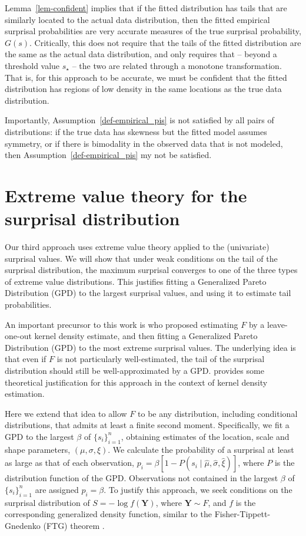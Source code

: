 \documentclass[
  12pt]{article}
\theoremstyle{definition}
\theoremstyle{plain}
\theoremstyle{plain}
\theoremstyle{plain}
\theoremstyle{remark}
\begin{document}
Lemma~\ref{lem-confident} implies that if the fitted distribution has
tails that are similarly located to the actual data distribution, then
the fitted empirical surprisal probabilities are very accurate measures
of the true surprisal probability, \(G(s)\). Critically, this does not
require that the tails of the fitted distribution are the same as the
actual data distribution, and only requires that -- beyond a threshold
value \(s_\star\) -- the two are related through a monotone
transformation. That is, for this approach to be accurate, we must be
confident that the fitted distribution has regions of low density in the
same locations as the true data distribution.

Importantly, Assumption~\ref{def-empirical_pis} is not satisfied by all
pairs of distributions: if the true data has skewness but the fitted
model assumes symmetry, or if there is bimodality in the observed data
that is not modeled, then Assumption~\ref{def-empirical_pis} my not be
satisfied.

\section{Extreme value theory for the surprisal
distribution}\label{sec-gpd}

Our third approach uses extreme value theory applied to the (univariate)
surprisal values. We will show that under weak conditions on the tail of
the surprisal distribution, the maximum surprisal converges to one of
the three types of extreme value distributions. This justifies fitting a
Generalized Pareto Distribution (GPD) to the largest surprisal values,
and using it to estimate tail probabilities.

An important precursor to this work is \citet{lookout} who proposed
estimating \(F\) by a leave-one-out kernel density estimate, and then
fitting a Generalized Pareto Distribution (GPD) to the most extreme
surprisal values. The underlying idea is that even if \(F\) is not
particularly well-estimated, the tail of the surprisal distribution
should still be well-approximated by a GPD. \citet{lookout2} provides
some theoretical justification for this approach in the context of
kernel density estimation.

Here we extend that idea to allow \(F\) to be any distribution,
including conditional distributions, that admits at least a finite
second moment. Specifically, we fit a GPD to the largest \(\beta\) of
\(\{s_i\}_{i=1}^n\), obtaining estimates of the location, scale and
shape parameters, \((\mu,\sigma,\xi)\). We calculate the probability of
a surprisal at least as large as that of each observation,
\(p_i = \beta\left[1-P(s_i \mid \hat\mu, \hat\sigma, \hat\xi)\right]\),
where \(P\) is the distribution function of the GPD. Observations not
contained in the largest \(\beta\) of \(\{s_i\}_{i=1}^n\) are assigned
\(p_i = \beta\). To justify this approach, we seek conditions on the
surprisal distribution of \(S = -\log f(\bm{Y})\), where
\(\bm{Y}\sim F\), and \(f\) is the corresponding generalized density
function, similar to the Fisher-Tippett-Gnedenko (FTG) theorem
\citep{coles2001introduction}.
\end{document}
